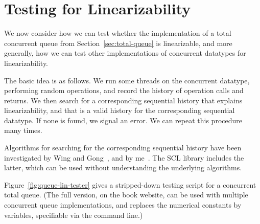 \section{Testing for Linearizability}

We now consider how we can test whether the implementation of a total
concurrent queue from Section~\ref{sec:total-queue} is linearizable, and more
generally, how we can test other implementations of concurrent datatypes for
linearizability.

The basic idea is as follows. We run some threads on the concurrent datatype,
performing random operations, and record the history of operation calls and
returns.  We then search for a corresponding sequential history that explains
linearizability, and that is a valid history for the corresponding sequential
datatype.  If none is found, we signal an error.  We can repeat this procedure
many times.

Algorithms for searching for the corresponding sequential history have been
investigated by Wing and Gong~\cite{wing-gong}, and by
me~\cite{gavin:lin-testing}.  The SCL library includes the latter, which can
be used without understanding the underlying algorithms. 

Figure~\ref{fig:queue-lin-tester} gives a stripped-down testing script for a
concurrent total queue.  (The full version, on the book website, can be used
with multiple concurrent queue implementations, and replaces the numerical
constants by variables, specifiable via the command line.)


